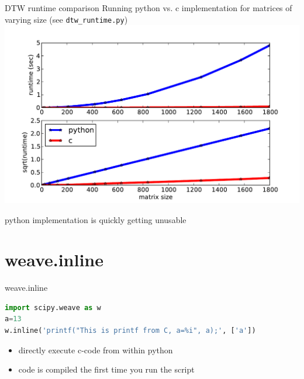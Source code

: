 \documentclass[german]{beamer}
\newcommand{\ra}{\text{$\rightarrow$}}
\begin{document}
\begin{frame}[fragile]{DTW runtime comparison}
  Running python vs. c implementation for matrices of varying size
  (see {\tt dtw\_runtime.py})
{  \centering
  \includegraphics[width=.8\textwidth]{pics/dtw_cvspython}}

\ra python implementation is quickly getting unusable
\end{frame}

\section{weave.inline}
\begin{frame}[fragile]{weave.inline}
  \begin{lstlisting}[language=Python,basicstyle=\footnotesize]
import scipy.weave as w
a=13
w.inline('printf("This is printf from C, a=%i", a);', ['a'])
  \end{lstlisting}
  \begin{itemize}
  \item directly execute c-code from within python
  \item code is compiled the first time you run the script
  \end{itemize}
\end{frame}
\end{document}
